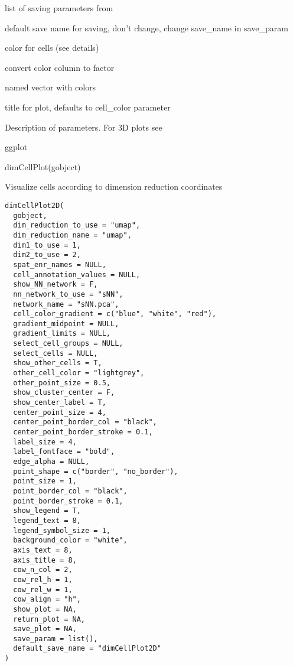 \documentclass[a4paper]{book}
\begin{document}
\begin{Arguments}
\begin{ldescription}
\item[\code{save\_param}] list of saving parameters from 

\item[\code{default\_save\_name}] default save name for saving, don't change, change save\_name in save\_param

\item[\code{cell\_color}] color for cells (see details)

\item[\code{color\_as\_factor}] convert color column to factor

\item[\code{cell\_color\_code}] named vector with colors

\item[\code{title}] title for plot, defaults to cell\_color parameter
\end{ldescription}
\end{Arguments}
%
\begin{Details}\relax
Description of parameters. For 3D plots see 
\end{Details}
%
\begin{Value}
ggplot
\end{Value}
%
\begin{Examples}
\begin{ExampleCode}
    dimCellPlot(gobject)
\end{ExampleCode}
\end{Examples}
%
\begin{Description}\relax
Visualize cells according to dimension reduction coordinates
\end{Description}
%
\begin{Usage}
\begin{verbatim}
dimCellPlot2D(
  gobject,
  dim_reduction_to_use = "umap",
  dim_reduction_name = "umap",
  dim1_to_use = 1,
  dim2_to_use = 2,
  spat_enr_names = NULL,
  cell_annotation_values = NULL,
  show_NN_network = F,
  nn_network_to_use = "sNN",
  network_name = "sNN.pca",
  cell_color_gradient = c("blue", "white", "red"),
  gradient_midpoint = NULL,
  gradient_limits = NULL,
  select_cell_groups = NULL,
  select_cells = NULL,
  show_other_cells = T,
  other_cell_color = "lightgrey",
  other_point_size = 0.5,
  show_cluster_center = F,
  show_center_label = T,
  center_point_size = 4,
  center_point_border_col = "black",
  center_point_border_stroke = 0.1,
  label_size = 4,
  label_fontface = "bold",
  edge_alpha = NULL,
  point_shape = c("border", "no_border"),
  point_size = 1,
  point_border_col = "black",
  point_border_stroke = 0.1,
  show_legend = T,
  legend_text = 8,
  legend_symbol_size = 1,
  background_color = "white",
  axis_text = 8,
  axis_title = 8,
  cow_n_col = 2,
  cow_rel_h = 1,
  cow_rel_w = 1,
  cow_align = "h",
  show_plot = NA,
  return_plot = NA,
  save_plot = NA,
  save_param = list(),
  default_save_name = "dimCellPlot2D"
)
\end{verbatim}
\end{Usage}
\end{document}
